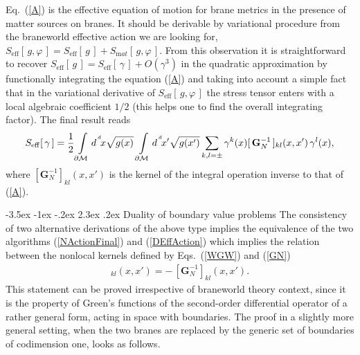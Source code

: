 \documentclass[a4paper,12pt]{article}
\makeatletter
\renewcommand\section{\@startsection {section}{1}{\z@}%
                                   {-3.5ex \@plus -1ex \@minus -.2ex}%
                                   {2.3ex \@plus.2ex}%
                                   {\normalfont\large\bfseries}}
\newcommand{\ddim}{{d}}
\newcommand{\M}{{\cal M}}
\newcommand{\dM}{{\partial \cal M}}
\newcommand{\dx}{d^{^{\,\ddim}} \!x}
\newcommand{\GrN}{\mathbf{G}_{N}}
\newcommand{\WGrDW}{\overrightarrow{\mathrm{W}}\mathbf{G}_{D}\!\overleftarrow{\mathrm{W}}}
\newcommand{\htt}{\gamma}   %
\makeatother
\begin{document}
Eq.~(\ref{A}) is the effective equation of motion for brane
metrics in the presence of matter sources on branes. It should be
derivable by variational procedure from the braneworld effective
action we are looking for,
$S_{\mathrm{eff}}[\,g,\varphi\,]=S_{\mathrm{eff}}[\,g\,]
+S_{\mathrm mat}[\,g,\varphi\,]$. From this observation it is
straightforward to recover $S_{\mathrm{eff}}[\,g\,]
=S_{\mathrm{eff}}[\,\htt\,]+O(\htt^3)$ in the quadratic
approximation by functionally integrating the equation (\ref{A})
and taking into account a simple fact that in the variational
derivative of $S_{\mathrm{eff}}[\,g,\varphi\,]$ the stress tensor
enters with a local algebraic coefficient $1/2$ (this helps one to
find the overall integrating factor). The final result reads
\cite{BWEA,Duality}
    \begin{eqnarray}
     S_{\mathrm{eff}}[\,\htt\,]
     = \frac12 \int\limits_\dM\dx\sqrt{g(x)}\,\int\limits_\dM \dx'\sqrt{g(x')} \sum_{k,l=\pm}
     \htt^k(x)[\,\GrN^{-1}\,]_{kl}(x,x')\,
     \htt^l(x),                        \label{NActionFinal}
    \end{eqnarray}
where $[\GrN^{-1}]_{kl}(x,x')$ is the kernel of the integral
operation inverse to that of (\ref{A}).

\section{Duality of boundary value problems}
The consistency of two alternative derivations of the above
type implies the equivalence of the two algorithms
(\ref{NActionFinal}) and (\ref{DEffAction}) which implies the
relation between the nonlocal kernels defined by Eqs.~(\ref{WGW}) and
(\ref{GN})
    \begin{eqnarray}
     [{\WGrDW}]_{kl}(x,x')=
     -\,[{\GrN^{-1}}]_{kl}(x,x').           \label{Relation}
    \end{eqnarray}
This statement can be proved \cite{Duality} irrespective of
braneworld theory context, since it is the property of
Green's functions of the second-order differential operator
of a rather general form, acting in space with boundaries.
The proof in a slightly more general setting, when the two
branes are replaced by the generic set of boundaries of
codimension one, looks as follows.

\renewcommand{\M}{{\cal M}}
\renewcommand{\dM}{{\partial \cal M}}
\end{document}
